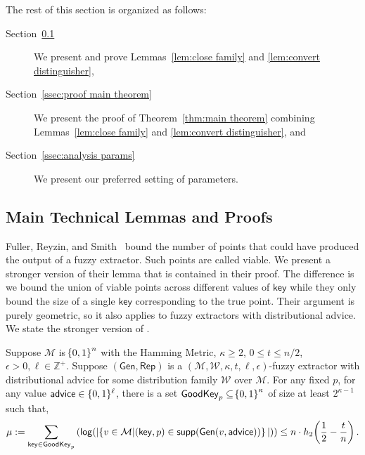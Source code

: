 \noindent
The rest of this section is organized as follows:
\begin{description}
\item[Section~\ref{ssec:proof overview}] We present and prove Lemmas~\ref{lem:close family} and \ref{lem:convert distinguisher},
\item[Section~\ref{ssec:proof main theorem}] We present the proof of Theorem~\ref{thm:main theorem} combining Lemmas~\ref{lem:close family} and \ref{lem:convert distinguisher}, and 
\item[Section~\ref{ssec:analysis params}] We present our preferred setting of parameters.
\end{description}

\subsection{Main Technical Lemmas and Proofs}
\label{ssec:proof overview}





Fuller, Reyzin, and Smith~\cite{fuller2016fuzzy,fuller2020fuzzy} bound the number of points that could have produced the output of a fuzzy extractor.  Such points are called viable.  We present a stronger version of their lemma that is contained in their proof.  The difference is we bound the union of viable points across different values of $\mathsf{key}$ while they only bound the size of a single $\mathsf{key}$ corresponding to the true point.  Their argument is purely geometric, so it also applies to fuzzy extractors with distributional advice. 
We state the stronger version of \cite[Lemma 5.2]{fuller2020fuzzy}.

\begin{lemma}
    \label{lem:smallgeneralviable}
    Suppose $\mathcal{M}$ is $\!\left\{ 0,1 \right\}^{n}$ with the Hamming Metric, $\kappa \geq 2$, $0 \leq t \leq n/2$, $\epsilon > 0, \ell\in\mathbb{Z}^+$. 
    Suppose $(\mathsf{Gen, Rep})$ is a $(\mathcal{M,W},\kappa, t, \ell, \epsilon)$-fuzzy extractor with distributional advice for some distribution family $\mathcal{W}$ over $\mathcal{M}$. 
    For any fixed $p$, for any value ${\mathsf{advice}} \in \{0, 1\}^\ell$, there is a set $\mathsf{GoodKey}_p \subseteq \!\left\{ 0,1 \right\}^{\kappa}$ of size at least $2^{\kappa - 1}$ such that,
    \[
      \mu:= \sum_{\mathsf{key} \in \mathsf{GoodKey}_p} \left( \mathsf{log}\!\left(|\!\left\{ v \in \mathcal{M}|\!\left(\mathsf{key}, p\right) \in \mathsf{supp}\!\left(\mathsf{Gen}(v, {\mathsf{advice}})\right) \right\}|\right)\right) \leq n \cdot h_2\!\left(\frac{1}{2} - \frac{t}{n}\right).
    \]   
\end{lemma}

